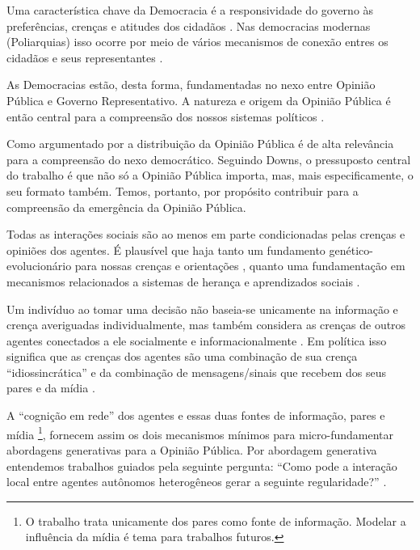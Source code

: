 Uma característica chave da Democracia é a responsividade do governo às
preferências, crenças e atitudes dos cidadãos
\cite{dahl1973polyarchy,bartels2003democracy}. Nas democracias modernas
(Poliarquias) isso ocorre por meio de vários mecanismos de conexão entres os
cidadãos e seus representantes \cite{dahl1989democracy,
  schumpeter2013capitalism}.

As Democracias estão, desta forma, fundamentadas no nexo entre Opinião Pública e
Governo Representativo. A natureza e origem da Opinião Pública é então
central para a compreensão dos nossos sistemas políticos
\cite{berelson1952democratic}.

Como argumentado por  a distribuição
da Opinião Pública é de alta relevância para a compreensão do nexo democrático.
Seguindo Downs, o pressuposto central do trabalho é que não só a Opinião Pública
importa, mas, mais especificamente, o seu formato também. Temos, portanto, por
propósito contribuir para a compreensão da emergência da Opinião
Pública.

Todas as interações sociais são ao menos em parte condicionadas pelas crenças e
opiniões dos agentes. É plausível que haja tanto um fundamento
genético-evolucionário para nossas crenças e orientações , quanto uma
fundamentação em mecanismos relacionados a sistemas de herança e aprendizados
sociais \cite{jablonka2014evolution, fowler2008biology, fowler2013defense}.

Um indivíduo ao tomar uma decisão não baseia-se unicamente na informação e
crença averiguadas individualmente, mas também considera as crenças de outros
agentes conectados a ele socialmente e informacionalmente
\cite{gintis2016individuality}. Em política isso significa que as crenças dos
agentes são uma combinação de sua crença ``idiossincrática'' e da combinação de
mensagens/sinais que recebem dos seus pares e da mídia
\cite{barabas2004deliberation,ryan2011social}.

A ``cognição em rede'' \cite{gintis2016individuality} dos agentes e essas duas
fontes de informação, pares e mídia \footnote{O trabalho trata unicamente dos
  pares como fonte de informação. Modelar a influência da mídia é tema para
  trabalhos futuros.}, fornecem assim os dois mecanismos mínimos para
micro-fundamentar abordagens generativas para a Opinião Pública. Por abordagem
generativa entendemos trabalhos guiados pela seguinte pergunta: ``Como pode a
interação local entre agentes autônomos heterogêneos gerar a seguinte
regularidade?'' \cite{epstein2006generative}.

